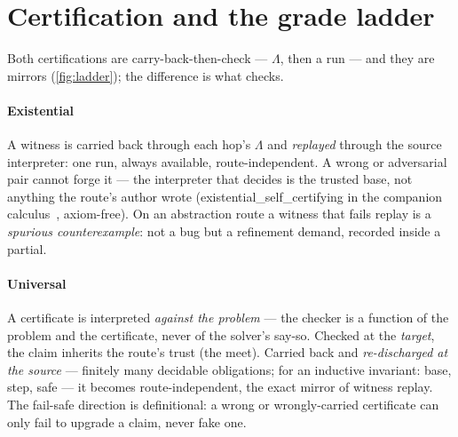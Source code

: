 
\section{Certification and the grade ladder}
\label{sec:cert}

Both certifications are carry-back-then-check --- $\Lambda$, then a
run --- and they are mirrors (\cref{fig:ladder}); the difference is
what checks.

\paragraph{Existential}
A witness is carried back through each hop's $\Lambda$ and
\emph{replayed} through the source interpreter: one run, always
available, route-independent. A wrong or adversarial pair cannot
forge it --- the interpreter that decides is the trusted base, not
anything the route's author wrote
(\textsf{existential\_self\_certifying} in the companion
calculus~\citep{hurdygurdy2026calculus}, axiom-free). On an
abstraction route a witness that fails replay is a \emph{spurious
counterexample}: not a bug but a refinement demand, recorded inside
a partial.

\paragraph{Universal}
A certificate is interpreted \emph{against the problem} --- the
checker is a function of the problem and the certificate, never of
the solver's say-so. Checked at the \emph{target}, the claim
inherits the route's trust (the meet). Carried back and
\emph{re-discharged at the source} --- finitely many decidable
obligations; for an inductive invariant: base, step, safe --- it
becomes route-independent, the exact mirror of witness replay. The
fail-safe direction is definitional: a wrong or wrongly-carried
certificate can only fail to upgrade a claim, never fake one.

